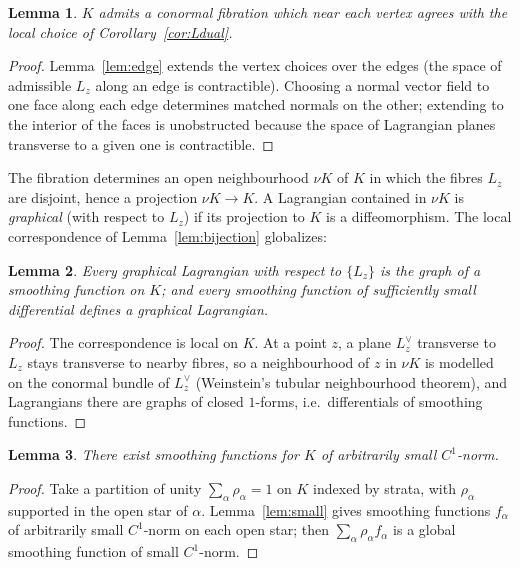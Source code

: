 \documentclass[11pt]{article}
\newcommand{\Ldual}{L^{\vee}}
\newtheorem{lemma}{Lemma}
\theoremstyle{definition}
\begin{document}
\begin{lemma}\label{lem:fibexists}
$K$ admits a conormal fibration which near each vertex agrees with the local
choice of Corollary~\ref{cor:Ldual}.
\end{lemma}

\begin{proof}
Lemma~\ref{lem:edge} extends the vertex choices over the edges (the space of
admissible $L_z$ along an edge is contractible). Choosing a normal vector field
to one face along each edge determines matched normals on the other; extending to
the interior of the faces is unobstructed because the space of Lagrangian planes
transverse to a given one is contractible.
\end{proof}

The fibration determines an open neighbourhood $\nu K$ of $K$ in which the fibres
$L_z$ are disjoint, hence a projection $\nu K\to K$. A Lagrangian contained in
$\nu K$ is \emph{graphical} (with respect to $L_z$) if its projection to $K$ is a
diffeomorphism. The local correspondence of Lemma~\ref{lem:bijection} globalizes:

\begin{lemma}\label{lem:graph-global}
Every graphical Lagrangian with respect to $\{L_z\}$ is the graph of a smoothing
function on $K$; and every smoothing function of sufficiently small differential
defines a graphical Lagrangian.
\end{lemma}

\begin{proof}
The correspondence is local on $K$. At a point $z$, a plane $\Ldual_z$ transverse
to $L_z$ stays transverse to nearby fibres, so a neighbourhood of $z$ in $\nu K$
is modelled on the conormal bundle of $\Ldual_z$ (Weinstein's tubular
neighbourhood theorem), and Lagrangians there are graphs of closed $1$-forms,
i.e.\ differentials of smoothing functions.
\end{proof}

\begin{lemma}\label{lem:small-global}
There exist smoothing functions for $K$ of arbitrarily small $C^1$-norm.
\end{lemma}

\begin{proof}
Take a partition of unity $\sum_\alpha\rho_\alpha=1$ on $K$ indexed by strata,
with $\rho_\alpha$ supported in the open star of $\alpha$. Lemma~\ref{lem:small}
gives smoothing functions $f_\alpha$ of arbitrarily small $C^1$-norm on each open
star; then $\sum_\alpha\rho_\alpha f_\alpha$ is a global smoothing function of
small $C^1$-norm.
\end{proof}
\end{document}
